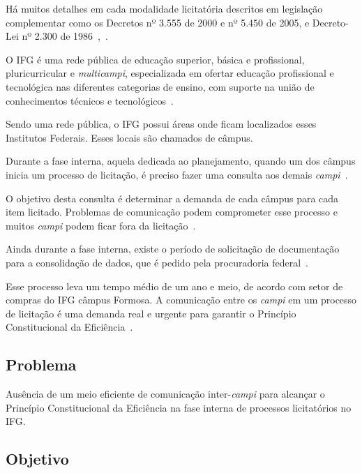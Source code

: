 Há muitos detalhes em cada modalidade licitatória descritos em legislação complementar como os Decretos nº 3.555 de 2000 e nº 5.450 de 2005, e Decreto-Lei nº 2.300 de 1986~\cite{l3555},~\cite{l5450}.

O IFG é uma rede pública de educação superior, básica e profissional, pluricurricular e \textit{multicampi}, especializada em ofertar educação profissional e tecnológica nas diferentes categorias de ensino, com suporte na união de conhecimentos técnicos e tecnológicos~\cite{apresentacao}.

Sendo uma rede pública, o IFG possui áreas onde ficam localizados esses Institutos Federais.
Esses locais são chamados de câmpus.

Durante a fase interna, aquela dedicada ao planejamento, quando um dos câmpus inicia um processo de licitação, é preciso fazer uma consulta aos demais \textit{campi}~\cite{carvalho2013manual}. 

O objetivo desta consulta é determinar a demanda de cada câmpus para cada item licitado. 
Problemas de comunicação podem comprometer esse processo e muitos \textit{campi} podem ficar fora da licitação~\cite{fernandes2005politicas}.

Ainda durante a fase interna, existe o período de solicitação de documentação para a consolidação de dados, que é pedido pela procuradoria federal~\cite{de2007curso}. 

Esse processo leva um tempo médio de um ano e meio, de acordo com setor de compras do IFG câmpus Formosa.
A comunicação entre os \textit{campi} em um processo de licitação é uma demanda real e urgente para garantir o Princípio Constitucional da Eficiência~\cite{l1988}.

\subsection*{Problema}
Ausência de um meio eficiente de comunicação inter-\textit{campi} para alcançar o Princípio Constitucional da Eficiência na fase interna de processos licitatórios no IFG.


\subsection*{Objetivo}

